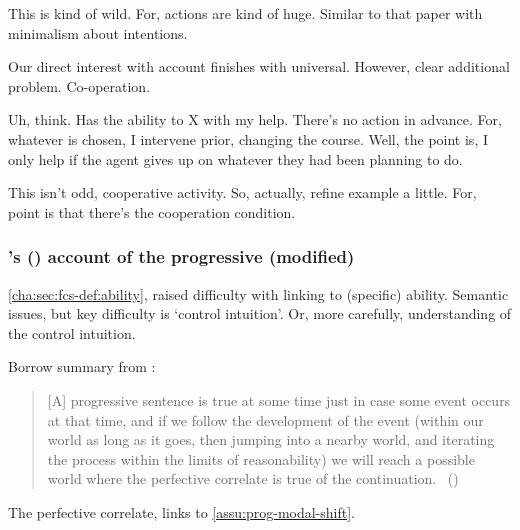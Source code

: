 \begin{note}
  This is kind of wild.
  For, actions are kind of huge.
  Similar to that paper with minimalism about intentions.
\end{note}

\begin{note}
  Our direct interest with account finishes with universal.
  However, clear additional problem.
  Co-operation.
\end{note}

\begin{note}
  Uh, think.
  Has the ability to X with my help.
  There's no action in advance.
  For, whatever is chosen, I intervene prior, changing the course.
  Well, the point is, I only help if the agent gives up on whatever they had been planning to do.

  This isn't odd, cooperative activity.
  So, actually, refine example a little.
  For, point is that there's the cooperation condition.
\end{note}

\subsubsection[\citeauthor{Landman:1992wh}'s account of the progressive (modified)]{\citeauthor{Landman:1992wh}'s (\citeyear{Landman:1992wh}) account of the progressive (modified)}
\label{cha:sec:fcs-def:progressive-landman}
\nocite{Portner:1998um}
\nocite{Engelberg:1999vi}

\begin{note}
  \autoref{cha:sec:fcs-def:ability}, raised difficulty with linking  to (specific) ability.
  Semantic issues, but key difficulty is `control intuition'.
  Or, more carefully, understanding of the control intuition.
\end{note}

\begin{note}
  Borrow summary from \textcite{Szabo:2004ul}:
  \begin{quote}
    [A] progressive sentence is true at some time just in case some event occurs at that time, and if we follow the development of the event (within our world as long as it goes, then jumping into a nearby world, and iterating the process within the limits of reasonability) we will reach a possible world where the perfective correlate is true of the continuation.%
    \mbox{ }\hfill\mbox{(\citeyear[34]{Szabo:2004ul})}
  \end{quote}
  The perfective correlate, links to \autoref{assu:prog-modal-shift}.
\end{note}

